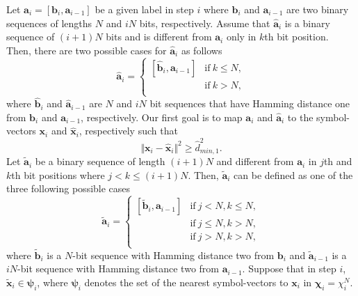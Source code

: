 \documentclass[12pt, draftclsnofoot, onecolumn]{IEEEtran}
\newcommand{\mb}[1]{\boldsymbol{#1}}
\begin{document}
Let $\mb{a}_{i} = [\mb{b}_{i},\mb{a}_{i-1}]$ be a given label in step $i$ where $\mb{b}_{i}$ and $\mb{a}_{i-1}$ are two binary sequences of lengths  $N$ and $iN$ bits, respectively. Assume that $\hat{\mb{a}}_{i}$ is a binary sequence of $(i+1)N$ bits and is different from $\mb{a}_{i}$ only in $k$th bit position. Then, there are two possible cases for $\hat{\mb{a}}_{i}$ as follows
\begin{equation}
\label{a_hat}
\hat{\mb{a}}_{i}  =\left\{
\begin{array}{ll}
[\hat{\mb{b}}_{i},\mb{a}_{i-1}] & \mbox{if}~ k\leq N,\\      

[\mb{b}_{i},\hat{\mb{a}}_{i-1}] & \mbox{if}~ k>N,\\ 
\end{array}\right.
\end{equation} where $\hat{\mb{b}}_{i}$ and $\hat{\mb{a}}_{i-1}$ are  $N$ and $iN$ bit sequences that 
have Hamming distance one from  $\mb{b}_{i}$ and $\mb{a}_{i-1}$, respectively. Our first goal is to map  $\mb{a}_{i}$ and $\hat{\mb{a}}_{i}$ to the symbol-vectors $\mb{x}_{i}$ and $\hat{\mb{x}}_{i}$, respectively such that 
\begin{equation}
\label{first_goals}
\Vert \mb{x}_{i} - \hat{\mb{x}}_{i}\Vert ^{2} \geqslant \hat{d}_{min,1}^{2}.
\end{equation} 
 Let $\tilde{\mb{a}}_{i}$ be a binary sequence of length $(i+1)N$ and different from $\mb{a}_{i}$ in $j$th and $k$th bit positions where $j < k \leqslant (i+1)N$. Then, $\tilde{\mb{a}}_{i}$ can be defined as one of the three following possible cases
\begin{equation}
\label{a_tilde}
\tilde{\mb{a}}_{i}  =\left\{
\begin{array}{ll}
[\tilde{\mb{b}}_{i},\mb{a}_{i-1}] & \mbox{if}~ j < N,k \leqslant N,\\ 

[\hat{\mb{b}}_{i},\hat{\mb{a}}_{i-1}] & \mbox{if}~ j\leqslant N,k>N,\\ 

[\mb{b}_{i},\tilde{\mb{a}}_{i-1}] & \mbox{if}~ j> N,k>N, \\ 
\end{array}\right.
\end{equation}
where $\tilde{\mb{b}}_{i}$ is a $N$-bit sequence with Hamming distance two from  $\mb{b}_{i}$ and  $\tilde{\mb{a}}_{i-1}$ is a $iN$-bit sequence with Hamming distance two from $\mb{a}_{i-1}$. Suppose that in step $i$, $\tilde{\mb{x}}_{i} \in \mb{\psi}_{i}$, where $\mb{\psi}_{i}$ denotes the set of the nearest symbol-vectors to $\mb{x}_{i}$ in $\mb{\chi}_i=\chi_i^N$.
\end{document}
